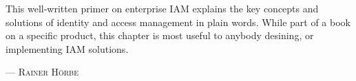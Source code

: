 This well-written primer on enterprise IAM explains the key concepts and solutions of identity and access management in plain words. While part of a book on a specific product, this chapter is most useful to anybody desining, or implementing IAM solutions.
\setlength{\parindent}{0cm}\par\textsc{ --- Rainer Hörbe }\par\vspace{12pt}\setlength{\parindent}{15pt}
